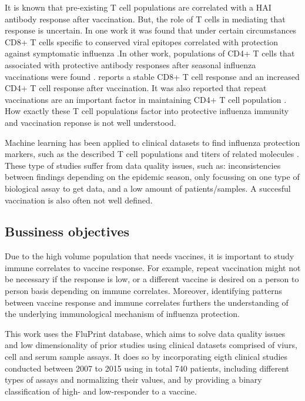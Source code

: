 It is known that pre-existing T cell populations are correlated with a HAI
antibody response after vaccination. But, the role of T cells in mediating that
response is uncertain. In one work it was found that under certain
circumstances CD8+ T cells specific to conserved viral epitopes correlated with
protection against symptomatic influenza
\citep{sridharCellularImmuneCorrelates2013}.In other work, populations of CD4+
T cells that associated with protective antibody responses after seasonal
influenza vaccinations were found \citep{bentebibelInductionICOSCXCR3}.
\cite{trieuLongtermMaintenanceInfluenzaSpecific2017} reports a stable CD8+ T
cell response and an increased CD4+ T cell response after vaccination. It was
also reported that repeat vaccinations are an important factor in maintaining
CD4+ T cell population \citep{trieuLongtermMaintenanceInfluenzaSpecific2017}.
How exactly these T cell populations factor into protective influenza immunity
and vaccination reponse is not well understood.

Machine learning has been applied to clinical datasets to find influenza
protection markers, such as the described T cell populations and titers of
related molecules \citep{furmanApoptosisOtherImmune2013,
sobolevAdjuvantedInfluenzaH1N1Vaccination2016, tsangGlobalAnalysesHuman2014}.
These type of studies suffer from data quality issues, such as: inconsistencies
between findings depending on the epidemic season, only focussing on one type
of biological assay to get data, and a low amount of patients/samples. A
succesful vaccination is also often not well defined.

\subsection{Bussiness objectives}

Due to the high volume population that needs vaccines, it is important to study
immune correlates to vaccine response. For example, repeat vaccination might
not be necessary if the response is low, or a different vaccine is desired on a
person to person basis depending on immune correlates. Moreover, identifying
patterns between vaccine response and immune correlates furthers the
understanding of the underlying immunological mechanism of influenza
protection.

This work uses the FluPrint database, which aims to solve data quality issues
and low dimensionality of prior studies using clinical datasets comprised of
viurs, cell and serum sample assays. It does so by incorporating eigth clinical
studies conducted between 2007 to 2015 using in total 740 patients, including
different types of assays and normalizing their values, and by providing a
binary classification of high- and low-responder to a vaccine.

